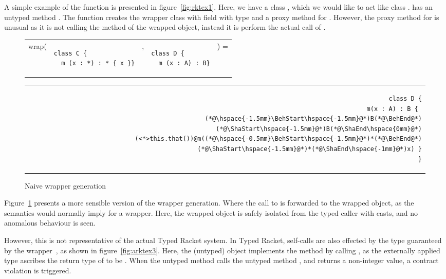 \documentclass[a4paper,USenglish]{tex/lipics-v2016}
\begin{document}
A simple example of the  function is presented in figure~\ref{fig:rktex1}. 
Here, we have a class \C, which we would like to act like class \D. 
\C has an untyped method \m. The  function creates the wrapper class \D 
with \that field with type \D and a proxy method for \m. 
However, the proxy method for \m is unusual as it is not calling 
the method \m of the wrapped object, instead it is perform the actual call of \m. 

\begin{figure}[!ht]
\begin{tabular}{ER{4.5cm}ER{3.5cm}E}
wrap( & 
\begin{lstlisting}
class C { 
  m (x : *) : * { x }}
\end{lstlisting}& , &
\begin{lstlisting}
class D { 
  m (x : A) : B}
\end{lstlisting}&) =
\end{tabular}
\begin{tabular}{@{}l@{}r@{}}
\hspace{4cm} \,&
\begin{minipage}{\textwidth-4cm}
\begin{lstlisting}
class D {
  m(x : A) : B { 
    (*@\hspace{-1.5mm}\BehStart\hspace{-1.5mm}@*)B(*@\BehEnd@*)(*@\ShaStart\hspace{-1.5mm}@*)B(*@\ShaEnd\hspace{0mm}@*)(<*>this.that())@m((*@\hspace{-0.5mm}\BehStart\hspace{-1.5mm}@*)*(*@\BehEnd@*)(*@\ShaStart\hspace{-1.5mm}@*)*(*@\ShaEnd\hspace{-1mm}@*)x) }
}
\end{lstlisting}
\end{minipage}
\end{tabular}
\caption{Naive wrapper generation}
\label{fig:rktex2}
\end{figure}

Figure~\ref{fig:rktex2} presents a more sensible version of the wrapper generation. 
Where the call to \m is forwarded to the wrapped object, as the semantics would 
normally imply for a wrapper. Here, the wrapped object is safely isolated from the typed caller 
with casts, and no anomalous behaviour is seen.

However, this is not representative of the actual Typed Racket system. In Typed
Racket, self-calls are also effected by the type guaranteed by the
wrapper~\cite{Takikawa:2012}, as shown in figure~\ref{fig:arktex3}. Here, the
(untyped)  object implements the  method by calling , 
as the externally applied type  ascribes the return type of 
to be . When the untyped method  calls the untyped method
, and returns a non-integer value, a contract violation is triggered.
\end{document}
